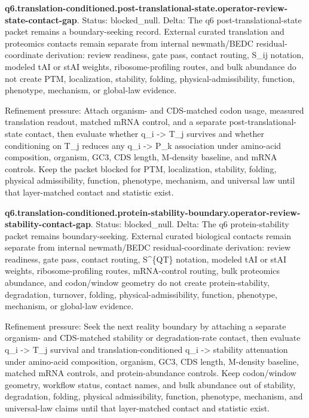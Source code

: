 \textbf{q6.translation-conditioned.post-translational-state.operator-review-state-contact-gap}. Status: blocked\_null. Delta: The q6 post-translational-state packet remains a boundary-seeking record. External curated translation and proteomics contacts remain separate from internal newmath/BEDC residual-coordinate derivation: review readiness, gate pass, contact routing, S\_ij notation, modeled tAI or stAI weights, ribosome-profiling routes, and bulk abundance do not create PTM, localization, stability, folding, physical-admissibility, function, phenotype, mechanism, or global-law evidence.

Refinement pressure: Attach organism- and CDS-matched codon usage, measured translation readout, matched mRNA control, and a separate post-translational-state contact, then evaluate whether q\_i -> T\_j survives and whether conditioning on T\_j reduces any q\_i -> P\_k association under amino-acid composition, organism, GC3, CDS length, M-density baseline, and mRNA controls. Keep the packet blocked for PTM, localization, stability, folding, physical admissibility, function, phenotype, mechanism, and universal law until that layer-matched contact and statistic exist.

\textbf{q6.translation-conditioned.protein-stability-boundary.operator-review-stability-contact-gap}. Status: blocked\_null. Delta: The q6 protein-stability packet remains boundary-seeking. External curated biological contacts remain separate from internal newmath/BEDC residual-coordinate derivation: review readiness, gate pass, contact routing, S\textasciicircum{}\{QT\} notation, modeled tAI or stAI weights, ribosome-profiling routes, mRNA-control routing, bulk proteomics abundance, and codon/window geometry do not create protein-stability, degradation, turnover, folding, physical-admissibility, function, phenotype, mechanism, or global-law evidence.

Refinement pressure: Seek the next reality boundary by attaching a separate organism- and CDS-matched stability or degradation-rate contact, then evaluate q\_i -> T\_j survival and translation-conditioned q\_i -> stability attenuation under amino-acid composition, organism, GC3, CDS length, M-density baseline, matched mRNA controls, and protein-abundance controls. Keep codon/window geometry, workflow status, contact names, and bulk abundance out of stability, degradation, folding, physical admissibility, function, phenotype, mechanism, and universal-law claims until that layer-matched contact and statistic exist.


